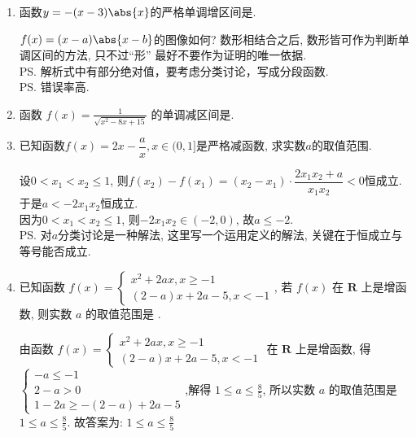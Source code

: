 \begin{enumerate}
\begin{enumerate}
        \item 判断$y=f(x)$的奇偶性，并证明你的结论. 
    \end{enumerate}
    \begin{jieda}
    容易判断出应该利用迭代法解决问题，首先考虑带入常值特值。令$a=b=0$, 则$f(0)=0$. 令$a=b=1$, 则$f(1)=0$. 令$a=1, b=-1$, 则$f(-1)=0$. \\
    下一步为了判断奇偶性，应当考虑得到$-x$的形式，故令$a=-1$, $b=x$, 则对任意$x$有$f(-x)=-f(x)+xf(-1)=-f(x)$. 故$f(x)$是奇函数. \\
    又不恒为0, 故仅是奇函数. 
    \end{jieda}
    \item 函数$y=-(x-3)\abs{x}$的严格单调增区间是\blkda{$[0,\frac{3}{2}]$}. 
    \begin{jieda}
    $f(x)=(x-a)\abs{x-b}$的图像如何? 数形相结合之后, 数形皆可作为判断单调区间的方法, 只不过``形'' 最好不要作为证明的唯一依据. \\
    \ps 解析式中有部分绝对值，要考虑分类讨论，写成分段函数. \\
    \ps 错误率高.
    \end{jieda}
    \item 函数 $f(x)=\frac{1}{\sqrt{x^2-8 x+15}}$ 的单调减区间是.
    \item 已知函数$f(x)=2x-\dfrac{a}{x}, x\in(0,1]$是严格减函数, 求实数$a$的取值范围. 
    \begin{jieda}
    设$0<x_1<x_2\leq 1$, 则$f(x_2)-f(x_1)=(x_2-x_1)\cdot\dfrac{2x_1x_2+a}{x_1x_2}<0$恒成立. \\
    于是$a<-2x_1x_2$恒成立. \\
    因为$0<x_1<x_2\leq 1$, 则$-2x_1x_2\in(-2,0)$, 故$a\leq -2$. \\
    \ps 对$a$分类讨论是一种解法, 这里写一个运用定义的解法, 关键在于恒成立与等号能否成立. 
    \end{jieda}
    \item 已知函数 $f(x)=\left\{\begin{array}{l}x^{2}+2 a x, x \geq-1 \\ (2-a) x+2 a-5, x<-1\end{array}\right.$, 若 $f(x)$ 在 $\mathbf{R}$ 上是增函数, 则实数 $a$ 的取值范围是 .
    \begin{jieda}
    由函数 $f(x)=\left\{\begin{array}{l}x^{2}+2 a x, x \geq-1 \\ (2-a) x+2 a-5, x<-1\end{array}\right.$ 在 $\mathbf{R}$ 上是增函数, 得 $\left\{\begin{array}{l}-a \leq-1 \\ 2-a>0 \\ 1-2 a \geq-(2-a)+2 a-5\end{array}\right.$,解得 $1 \leq a \leq \frac{8}{5}$,
    所以实数 $a$ 的取值范围是 $1 \leq a \leq \frac{8}{5}$.
    故答案为: $1 \leq a \leq \frac{8}{5}$
    \end{jieda}
    

\end{enumerate}
